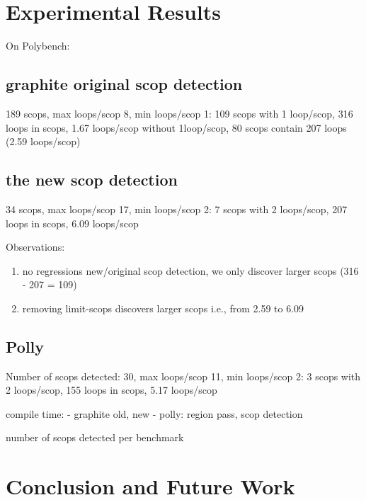\documentclass{sigplanconf}
\begin{document}
\section{Experimental Results}
On Polybench:
\subsection{graphite original scop detection}
189 scops, max loops/scop 8, min loops/scop 1: 109 scops with 1 loop/scop, 316 loops in scops, 1.67 loops/scop
without 1loop/scop, 80 scops contain 207 loops (2.59 loops/scop)

\subsection{the new scop detection}
34 scops, max loops/scop 17, min loops/scop 2: 7 scops with 2 loops/scop, 207 loops in scops, 6.09 loops/scop

Observations:
\begin{enumerate}
  \item no regressions new/original scop detection, we only discover larger scops (316 - 207 = 109)
  \item removing limit-scops discovers larger scops i.e., from 2.59 to 6.09
\end{enumerate}


\subsection{Polly}
Number of scops detected: 30, max loops/scop 11, min loops/scop 2: 3 scops with 2 loops/scop, 155 loops in scops, 5.17 loops/scop

compile time:
- graphite old, new
- polly: region pass, scop detection

number of scops detected per benchmark

\section{Conclusion and Future Work}



{\small

}
\end{document}
